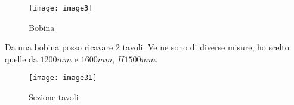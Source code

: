 \begin{figure}[H]
	\centering
	\texttt{[image: image3]}
	\caption{Bobina}
	\label{fig:mesh1}
\end{figure}



Da una bobina posso ricavare 2 tavoli. 
Ve ne sono di diverse misure, ho scelto quelle da 
$1200 mm$ e $1600 mm$, $H 1500 mm$.

\begin{figure}[H]
	\centering
	\texttt{[image: image31]}
	\caption{Sezione tavoli}
	\label{fig:mesh1}
\end{figure}
